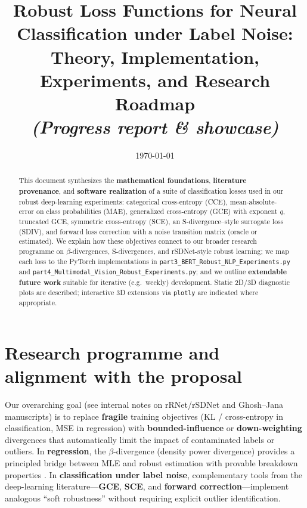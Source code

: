 \documentclass[11pt,a4paper]{article}
\title{\textbf{Robust Loss Functions for Neural Classification under Label Noise:}\\
Theory, Implementation, Experiments, and Research Roadmap\\
\textit{(Progress report \& showcase)}}
\author{}
\date{\today}
\begin{document}
\maketitle

\begin{abstract}
This document synthesizes the \textbf{mathematical foundations}, \textbf{literature provenance}, and \textbf{software realization} of a suite of classification losses used in our robust deep-learning experiments: categorical cross-entropy (CCE), mean-absolute-error on class probabilities (MAE), generalized cross-entropy (GCE) with exponent $q$, truncated GCE, symmetric cross-entropy (SCE), an S-divergence--style surrogate loss (SDIV), and forward loss correction with a noise transition matrix (oracle or estimated). We explain how these objectives connect to our broader research programme on $\beta$-divergences, S-divergences, and rSDNet-style robust learning; we map each loss to the PyTorch implementations in \texttt{part3\_BERT\_Robust\_NLP\_Experiments.py} and \texttt{part4\_Multimodal\_Vision\_Robust\_Experiments.py}; and we outline \textbf{extendable future work} suitable for iterative (e.g.\ weekly) development. Static 2D/3D diagnostic plots are described; interactive 3D extensions via \texttt{plotly} are indicated where appropriate.
\end{abstract}

\tableofcontents
\newpage

\section{Research programme and alignment with the proposal}

Our overarching goal (see internal notes on rRNet/rSDNet and Ghosh--Jana manuscripts) is to replace \textbf{fragile} training objectives (KL / cross-entropy in classification, MSE in regression) with \textbf{bounded-influence} or \textbf{down-weighting} divergences that automatically limit the impact of contaminated labels or outliers. In \textbf{regression}, the $\beta$-divergence (density power divergence) provides a principled bridge between MLE and robust estimation with provable breakdown properties \cite{ghosh2017janaarxiv}. In \textbf{classification under label noise}, complementary tools from the deep-learning literature---\textbf{GCE}, \textbf{SCE}, and \textbf{forward correction}---implement analogous ``soft robustness'' without requiring explicit outlier identification.
\end{document}
